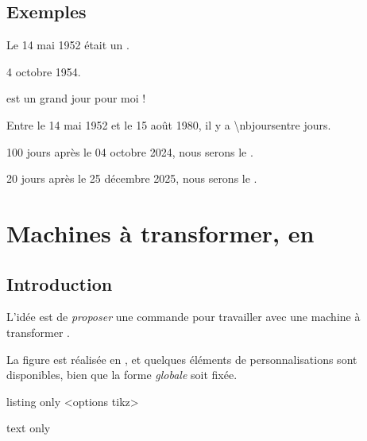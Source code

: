 \subsection{Exemples}

\begin{PresCodeTexPL}{}
Le 14 mai 1952 était un .

 4 octobre 1954.

 est un grand jour pour moi !
\end{PresCodeTexPL}

\begin{PresCodeTexPL}{}
Entre le 14 mai 1952 et le 15 août 1980, il y a \num{\nbjoursentre} jours.
\end{PresCodeTexPL}

\begin{PresCodeTexPL}{}
100 jours après le 04 octobre 2024, nous serons le .

20 jours après le 25 décembre 2025, nous serons le .
\end{PresCodeTexPL}

\pagebreak


\section{Machines à transformer, en \TikZ}\label{machtransf}

\subsection{Introduction}

\begin{tipblock}
 L'idée est de \textit{proposer} une commande pour travailler avec une \og machine à transformer \fg.

La figure est réalisée en \TikZ, et quelques éléments de personnalisations sont disponibles, bien que la forme \textit{globale} soit fixée.
\end{tipblock}

\begin{PresCodeTexPL}{listing only}
<options tikz>
\end{PresCodeTexPL}

\begin{PresCodeTexPL}{text only}
\MachineTransformer{}
\end{PresCodeTexPL}

